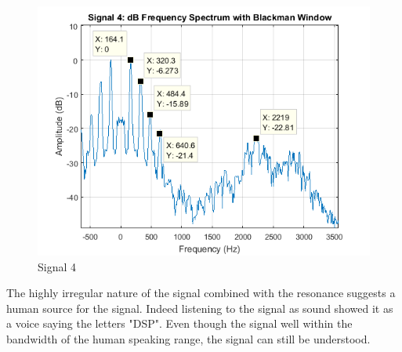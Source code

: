 \documentclass[pdftex, 10pt]{IEEEtran}
\begin{document}
\begin{figure}
    \centering
    \includegraphics[scale=0.5]{sig4_fd_bm_db}
    \caption{Signal 4}
    \label{fig:sig4_fd_bm_db}
\end{figure}

The highly irregular nature of the signal combined with the resonance suggests a human source
for the signal. Indeed listening to the signal as sound showed it as a voice saying the letters
"DSP". Even though the signal well within the bandwidth of the human speaking range, the signal
can still be understood.
\end{document}
